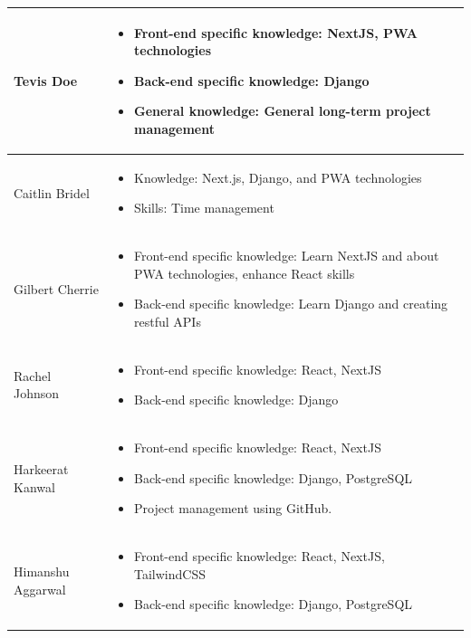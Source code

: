 \documentclass[12pt]{article}
\begin{document}
\begin{longtable}{|>{\centering\arraybackslash}m{.22\linewidth}|>{\centering\arraybackslash}m{.78\linewidth}| }
Tevis Doe &  \begin{itemize}
    \item Front-end specific knowledge: NextJS, PWA technologies
    \item Back-end specific knowledge: Django
    \item General knowledge: General long-term project management
\end{itemize} \\
\hline
Caitlin Bridel &  \begin{itemize}
    \item Knowledge: Next.js, Django, and PWA technologies
    \item Skills: Time management
\end{itemize}\\ 
\hline
Gilbert Cherrie & \begin{itemize}
    \item Front-end specific knowledge: Learn NextJS and about PWA technologies, enhance React skills
    \item Back-end specific knowledge: Learn Django and creating restful APIs
\end{itemize} \\ 
\hline
Rachel Johnson & \begin{itemize}
    \item Front-end specific knowledge: React, NextJS
    \item Back-end specific knowledge: Django
\end{itemize} \\ 
\hline
Harkeerat Kanwal & \begin{itemize}
    \item Front-end specific knowledge: React, NextJS
    \item Back-end specific knowledge: Django, PostgreSQL
    \item Project management using GitHub.
\end{itemize} \\ 
\hline
Himanshu Aggarwal & \begin{itemize}
    \item Front-end specific knowledge: React, NextJS, TailwindCSS
    \item Back-end specific knowledge: Django, PostgreSQL
\end{itemize} \\ 
\hline
\end{longtable}
\end{document}
